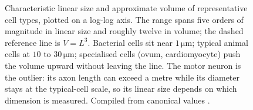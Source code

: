 \begin{figure}[htbp]
\caption[Cell-size scaling]{Characteristic linear size and approximate
volume of representative cell types, plotted on a log-log axis. The
range spans five orders of magnitude in linear size and roughly twelve
in volume; the dashed reference line is $V = L^3$. Bacterial cells
sit near $1\,\si{\micro\meter}$; typical animal cells at $10$ to
$30\,\si{\micro\meter}$; specialised cells (ovum, cardiomyocyte)
push the volume upward without leaving the line. The motor neuron is
the outlier: its axon length can exceed a metre while its diameter
stays at the typical-cell scale, so its linear size depends on which
dimension is measured. Compiled from canonical values
\cite{text:v6c01-bionumbers-2015,paper:v6c01-bianconi-2013}.}
\label{fig:vol06:ch01:size-scaling}
\end{figure}
